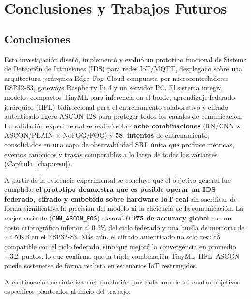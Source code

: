 \chapter{Conclusiones y Trabajos Futuros}
\label{chap:conc}

\section{Conclusiones}

Esta investigación diseñó, implementó y evaluó un prototipo funcional de Sistema de Detección de Intrusiones (IDS) para redes IoT/MQTT, desplegado sobre una arquitectura jerárquica Edge--Fog--Cloud compuesta por microcontroladores ESP32-S3, gateways Raspberry Pi 4 y un servidor PC. El sistema integra modelos compactos TinyML para inferencia en el borde, aprendizaje federado jerárquico (HFL) bidireccional para el entrenamiento colaborativo y cifrado autenticado ligero ASCON-128 para proteger todos los canales de comunicación. La validación experimental se realizó sobre \textbf{ocho combinaciones} (RN/CNN $\times$ ASCON/PLAIN $\times$ NoFOG/FOG) y \textbf{58~intentos} de entrenamiento, consolidados en una capa de observabilidad SRE única que produce métricas, eventos canónicos y trazas comparables a lo largo de todas las variantes (Capítulo~\ref{chap:resu}).

A partir de la evidencia experimental se concluye que el objetivo general fue cumplido: \textbf{el prototipo demuestra que es posible operar un IDS federado, cifrado y embebido sobre hardware IoT real} sin sacrificar de forma significativa la precisión del modelo ni la eficiencia de la comunicación. La mejor variante (\texttt{CNN\_ASCON\_FOG}) alcanzó \textbf{0.975 de accuracy global} con un costo criptográfico inferior al $0.3\%$ del ciclo federado y una huella de memoria de $\sim$4.5\,KB en el ESP32-S3. Más aún, el cifrado autenticado no solo resultó compatible con el ciclo federado, sino que mejoró la convergencia en promedio $+3.2$~puntos, lo que confirma que la triple combinación TinyML--HFL--ASCON puede sostenerse de forma realista en escenarios IoT restringidos.

A continuación se sintetiza una conclusión por cada uno de los cuatro objetivos específicos planteados al inicio del trabajo:


